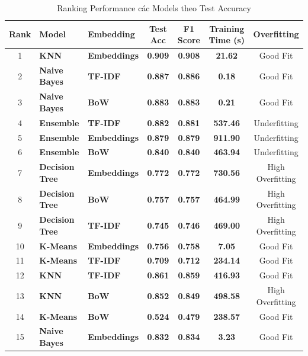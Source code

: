 \begin{table}[H]
\centering
\begin{tabular}{|c|l|l|c|c|c|c|}
\hline
\textbf{Rank} & \textbf{Model} & \textbf{Embedding} & \textbf{Test Acc} & \textbf{F1 Score} & \textbf{Training Time (s)} & \textbf{Overfitting} \\
\hline
1 & \textbf{KNN} & \textbf{Embeddings} & \textbf{0.909} & \textbf{0.908} & \textbf{21.62} & Good Fit \\
\hline
2 & \textbf{Naive Bayes} & \textbf{TF-IDF} & \textbf{0.887} & \textbf{0.886} & \textbf{0.18} & Good Fit \\
\hline
3 & \textbf{Naive Bayes} & \textbf{BoW} & \textbf{0.883} & \textbf{0.883} & \textbf{0.21} & Good Fit \\
\hline
4 & \textbf{Ensemble} & \textbf{TF-IDF} & \textbf{0.882} & \textbf{0.881} & \textbf{537.46} & Underfitting \\
\hline
5 & \textbf{Ensemble} & \textbf{Embeddings} & \textbf{0.879} & \textbf{0.879} & \textbf{911.90} & Underfitting \\
\hline
6 & \textbf{Ensemble} & \textbf{BoW} & \textbf{0.840} & \textbf{0.840} & \textbf{463.94} & Underfitting \\
\hline
7 & \textbf{Decision Tree} & \textbf{Embeddings} & \textbf{0.772} & \textbf{0.772} & \textbf{730.56} & High Overfitting \\
\hline
8 & \textbf{Decision Tree} & \textbf{BoW} & \textbf{0.757} & \textbf{0.757} & \textbf{464.99} & High Overfitting \\
\hline
9 & \textbf{Decision Tree} & \textbf{TF-IDF} & \textbf{0.745} & \textbf{0.746} & \textbf{469.00} & High Overfitting \\
\hline
10 & \textbf{K-Means} & \textbf{Embeddings} & \textbf{0.756} & \textbf{0.758} & \textbf{7.05} & Good Fit \\
\hline
11 & \textbf{K-Means} & \textbf{TF-IDF} & \textbf{0.709} & \textbf{0.712} & \textbf{234.14} & Good Fit \\
\hline
12 & \textbf{KNN} & \textbf{TF-IDF} & \textbf{0.861} & \textbf{0.859} & \textbf{416.93} & Good Fit \\
\hline
13 & \textbf{KNN} & \textbf{BoW} & \textbf{0.852} & \textbf{0.849} & \textbf{498.58} & High Overfitting \\
\hline
14 & \textbf{K-Means} & \textbf{BoW} & \textbf{0.524} & \textbf{0.479} & \textbf{238.57} & Good Fit \\
\hline
15 & \textbf{Naive Bayes} & \textbf{Embeddings} & \textbf{0.832} & \textbf{0.834} & \textbf{3.23} & Good Fit \\
\hline
\end{tabular}
\caption{Ranking Performance các Models theo Test Accuracy}
\label{tab:model_performance_ranking}
\end{table}


